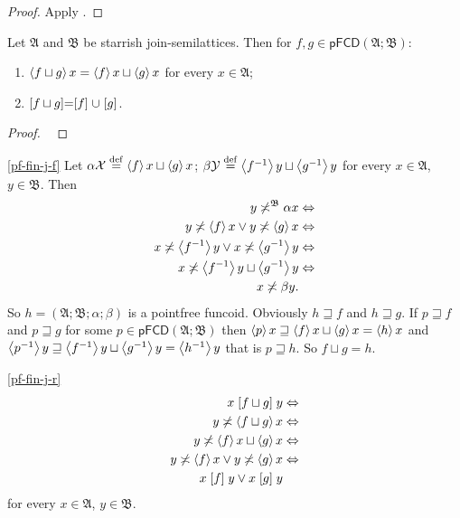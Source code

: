 \begin{proof}
Apply \cite{pm:complete-lattice-criteria}.\end{proof}
\begin{thm}
\label{pf-fin-join}Let $\mathfrak{A}$ and $\mathfrak{B}$ be starrish
join-semilattices. Then for $f,g\in\mathsf{pFCD}(\mathfrak{A};\mathfrak{B})$:
\begin{enumerate}
\item \label{pf-fin-j-f}$\left\langle f\sqcup g\right\rangle x=\left\langle f\right\rangle x\sqcup\left\langle g\right\rangle x$
for every $x\in\mathfrak{A}$;
\item \label{pf-fin-j-r}$\mathrel{\left[f\sqcup g\right]}=\mathrel{\left[f\right]}\cup\mathrel{\left[g\right]}$.
\end{enumerate}
\end{thm}
\begin{proof}
~\end{proof}
\begin{widedisorder}
\item [{\ref{pf-fin-j-f}}] Let $\alpha\mathcal{X}\overset{\mathrm{def}}{=}\left\langle f\right\rangle x\sqcup\left\langle g\right\rangle x$;
$\beta\mathcal{Y}\overset{\mathrm{def}}{=}\left\langle f^{-1}\right\rangle y\sqcup\left\langle g^{-1}\right\rangle y$ for
every $x\in\mathfrak{A}$, $y\in\mathfrak{B}$. Then
\begin{align*}
y\not\asymp^{\mathfrak{B}}\alpha x & \Leftrightarrow\\
y\not\asymp\left\langle f\right\rangle x\lor y\not\asymp\left\langle g\right\rangle x & \Leftrightarrow\\
x\not\asymp\left\langle f^{-1}\right\rangle y\lor x\not\asymp\left\langle g^{-1}\right\rangle y & \Leftrightarrow\\
x\not\asymp\left\langle f^{-1}\right\rangle y\sqcup\left\langle g^{-1}\right\rangle y & \Leftrightarrow\\
x\not\asymp\beta y.
\end{align*}
So $h=(\mathfrak{A};\mathfrak{B};\alpha;\beta)$ is a pointfree funcoid.
Obviously $h\sqsupseteq f$ and $h\sqsupseteq g$. If $p\sqsupseteq f$
and $p\sqsupseteq g$ for some $p\in\mathsf{pFCD}(\mathfrak{A};\mathfrak{B})$
then $\left\langle p\right\rangle x\sqsupseteq\left\langle f\right\rangle x\sqcup\left\langle g\right\rangle x=\left\langle h\right\rangle x$
and $\left\langle p^{-1}\right\rangle y\sqsupseteq\left\langle f^{-1}\right\rangle y\sqcup\left\langle g^{-1}\right\rangle y=\left\langle h^{-1}\right\rangle y$
that is $p\sqsupseteq h$. So $f\sqcup g=h$.
\item [{\ref{pf-fin-j-r}}] ~
\begin{align*}
x\mathrel{\left[f\sqcup g\right]}y & \Leftrightarrow\\
y\not\asymp\left\langle f\sqcup g\right\rangle x & \Leftrightarrow\\
y\not\asymp\left\langle f\right\rangle x\sqcup\left\langle g\right\rangle x & \Leftrightarrow\\
y\not\asymp\left\langle f\right\rangle x\lor y\not\asymp\left\langle g\right\rangle x & \Leftrightarrow\\
x\mathrel{\left[f\right]}y\lor x\mathrel{\left[g\right]}y
\end{align*}
for every $x\in\mathfrak{A}$, $y\in\mathfrak{B}$.\end{widedisorder}
